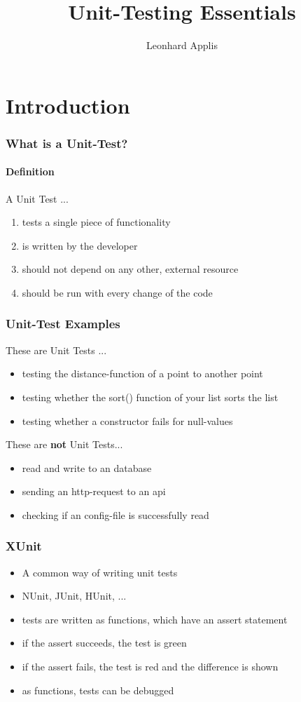 \documentclass[12pt]{beamer}
\begin{document}
	\author{Leonhard Applis}
	\title{Unit-Testing Essentials}
	\begin{frame}[plain]
		\maketitle
	\end{frame}
	
	\section{Introduction}
	
	\begin{frame}
		\frametitle{What is a Unit-Test?}
		\framesubtitle{Definition}
		A Unit Test ... 
		\begin{enumerate}
			\item tests a single piece of functionality
			\item is written by the developer
			\item should not depend on any other, external resource
			\item should be run with every change of the code
		\end{enumerate}
	\end{frame}

	\begin{frame}
		\frametitle{Unit-Test Examples}
		These are Unit Tests ...
		\begin{itemize}
			\item testing the distance-function of a point to another point
			\item testing whether the sort() function of your list sorts the list 
			\item testing whether a constructor fails for null-values
		\end{itemize}
		These are \textbf{not} Unit Tests...
		\begin{itemize}
			\item read and write to an database 
			\item sending an http-request to an api 
			\item checking if an config-file is successfully read
		\end{itemize}
	\end{frame}

	\begin{frame}
		\frametitle{XUnit}
		\begin{itemize}
			\item A common way of writing unit tests
			\item NUnit, JUnit, HUnit, ...
			\item tests are written as functions, which have an assert statement
			\item if the assert succeeds, the test is green
			\item if the assert fails, the test is red and the difference is shown
			\item as functions, tests can be debugged
		\end{itemize}
	\end{frame}
	
\end{document}
